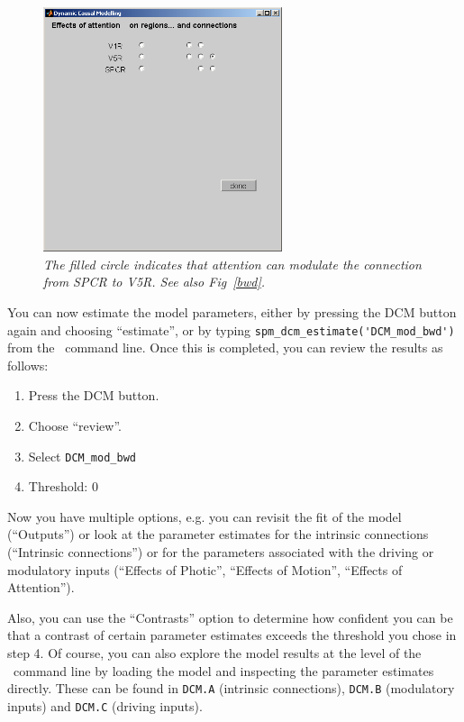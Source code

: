 \begin{figure}[ht]
\begin{center}
\includegraphics[width=70mm]{dcm/Fig7}
\caption{\em The filled circle indicates that attention can modulate the connection from SPCR to V5R. See also Fig~\ref{bwd}.\label{fig7}}
\end{center}
\end{figure}

You can now estimate the model parameters, either by pressing the DCM button again and choosing ``estimate'', or by typing \verb!spm_dcm_estimate('DCM_mod_bwd')! from the \matlab\ command line.  Once this is completed, you can review the results as follows:
\begin{enumerate}
\item{Press the DCM button.}
\item{Choose ``review''.}
\item{Select \verb!DCM_mod_bwd!}
\item{Threshold: 0}
\end{enumerate}
Now you have multiple options, e.g. you can revisit the fit of the model (``Outputs'') or look at the parameter estimates for the intrinsic connections (``Intrinsic connections'') or for the parameters associated with the driving or modulatory inputs (``Effects of Photic'', ``Effects of Motion'', ``Effects of Attention'').

Also, you can use the ``Contrasts'' option to determine how confident you can be that a contrast of certain parameter estimates exceeds the threshold you chose in step 4.
Of course, you can also explore the model results at the level of the \matlab\ command line by loading the model and inspecting the parameter estimates directly.  These can be found in \texttt{DCM.A} (intrinsic connections), \texttt{DCM.B} (modulatory inputs) and \texttt{DCM.C} (driving inputs).


